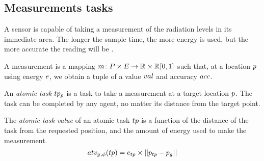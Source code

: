 
\newcommand{\varMeasurementValue}[2]{\varSymbol{val}{#1}{#2}}
\newcommand{\varMeasurementAccuracy}[2]{\varSymbol{acc}{#1}{#2}}
\newcommand{\varLocation}[2]{\varSymbol{p}{#1}{#2}}
\newcommand{\setLocation}[2]{\setSymbol{P}{#1}{#2}}
\newcommand{\varEnergy}[2]{\varSymbol{e}{#1}{#2}}
\newcommand{\setEnergy}[2]{\setSymbol{E}{#1}{#2}}
\newcommand{\formalMeasurement}[2]{
	\functionFormal{m}
	{\setLocation{}{} \times \setEnergy{}{}}
	{\setRealNumbers{}{} \times \setRealNumbersUnit{}{}}
}

\subsection{Measurements tasks}
A sensor is capable of taking a measurement of the radiation levels in its immediate area. The longer the sample time, the more energy is used, but the more accurate the reading will be \cite{dummy}.
\begin{definition}[Measurement]
	A measurement is a mapping $\formalMeasurement{}{}$ such that, at a location $\varLocation{}{}$ using energy $\varEnergy{}{}$, we obtain a tuple of a value $\varMeasurementValue{}{}$ and accuracy $\varMeasurementAccuracy{}{}$.
\end{definition}


\begin{definition}
	An \textit{atomic task} $\varAtomicTask{\varLocation{}{}}{}$ is a task to take a measurement at a target location $\varLocation{}{}$. The task can be completed by any agent, no matter its distance from the target point.
\end{definition}

\newcommand{\functionAtomicTaskQualitySignature}[2]{
	\functionSignature{atv_{\varAgent{}{}, \varTime{}{}}} {\varAtomicTask{}{}}
}
\begin{definition}
	The \textit{atomic task value} of an atomic task $\varAtomicTask{}{}$ is a function of the distance of the task from the requested position, and the amount of energy used to make the measurement.
	\begin{equation}
		\functionAtomicTaskQualitySignature{}{} = \varEnergy{\varAtomicTask{}{}}{} \times \funcSize{\funcSize{\varLocation{\varAtomicTask{}{}}{} - \varLocation{\varAgent{}{}}{}}{}}{}
	\end{equation}
\end{definition}


